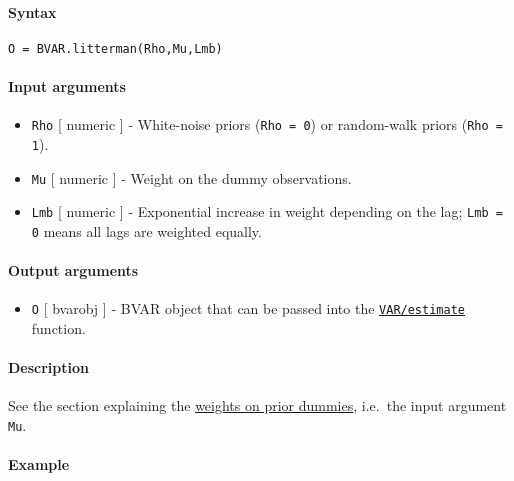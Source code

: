 


	\paragraph{Syntax}

\begin{verbatim}
O = BVAR.litterman(Rho,Mu,Lmb)
\end{verbatim}

\paragraph{Input arguments}

\begin{itemize}
\item
  \texttt{Rho} {[} numeric {]} - White-noise priors (\texttt{Rho = 0})
  or random-walk priors (\texttt{Rho = 1}).
\item
  \texttt{Mu} {[} numeric {]} - Weight on the dummy observations.
\item
  \texttt{Lmb} {[} numeric {]} - Exponential increase in weight
  depending on the lag; \texttt{Lmb = 0} means all lags are weighted
  equally.
\end{itemize}

\paragraph{Output arguments}

\begin{itemize}
\itemsep1pt\parskip0pt
\item
  \texttt{O} {[} bvarobj {]} - BVAR object that can be passed into the
  \href{VAR/estimate}{\texttt{VAR/estimate}} function.
\end{itemize}

\paragraph{Description}

See the section explaining the \href{BVAR/Contents}{weights on prior
dummies}, i.e.~the input argument \texttt{Mu}.

\paragraph{Example}


